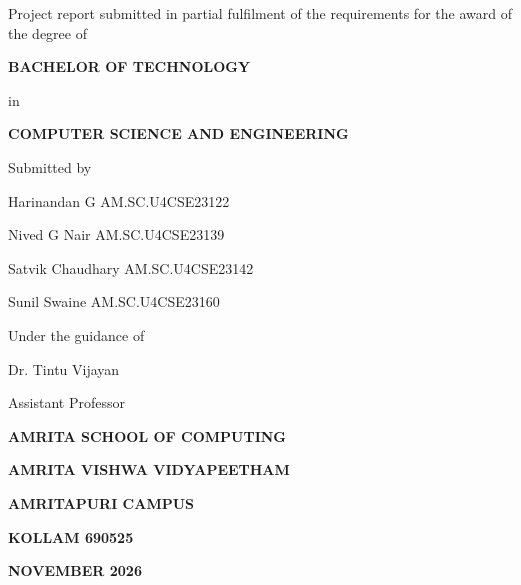 
\pagestyle{empty}

{\centering \Large\bfseries \ProjectTitle{}\par}
\vspace{0.6cm}
{\centering Project report submitted in partial fulfilment of the requirements for the award of the degree of\par}
\vspace{0.3cm}
{\centering \textbf{BACHELOR OF TECHNOLOGY}\par}
{\centering in\par}
{\centering \textbf{COMPUTER SCIENCE AND ENGINEERING}\par}
\vspace{0.4cm}
{\centering Submitted by\par}
\vspace{0.2cm}
{\centering \fontsize{14}{18}\selectfont
Harinandan G \quad AM.SC.U4CSE23122\par}

{\centering \fontsize{14}{18}\selectfont
Nived G Nair \quad AM.SC.U4CSE23139\par}

{\centering \fontsize{14}{18}\selectfont
Satvik Chaudhary \quad AM.SC.U4CSE23142\par}

{\centering \fontsize{14}{18}\selectfont
Sunil Swaine \quad AM.SC.U4CSE23160\par}
\vspace{0.4cm}
{\centering \fontsize{14}{18}\selectfont
Under the guidance of\par
Dr. Tintu Vijayan\par
Assistant Professor\par}
\vspace{0.4cm}
{\centering \institutionlogo{4.5in}\par}
\vspace{0.3cm}
{\centering \textbf{AMRITA SCHOOL OF COMPUTING}\par}
{\centering \textbf{AMRITA VISHWA VIDYAPEETHAM}\par}
{\centering \textbf{AMRITAPURI CAMPUS}\par}
{\centering \textbf{KOLLAM 690525}\par}
{\centering \textbf{NOVEMBER 2026}\par}


